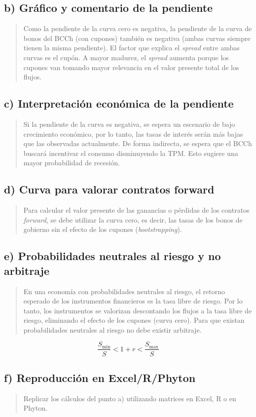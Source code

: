 \documentclass[12pt]{article}
\begin{document}
\newpage

\subsection*{b) Gráfico y comentario de la pendiente}

\begin{quote}
Como la pendiente de la curva cero es negativa, la pendiente de la curva de bonos del BCCh (con cupones) también es negativa (ambas curvas siempre tienen la misma pendiente). El factor que explica el \textit{spread} entre ambas curvas es el cupón. A mayor madurez, el \textit{spread} aumenta porque los cupones van tomando mayor relevancia en el valor presente total de los flujos.
\end{quote}

\subsection*{c) Interpretación económica de la pendiente}

\begin{quote}
Si la pendiente de la curva es negativa, se espera un escenario de bajo crecimiento económico, por lo tanto, las tasas de interés serán más bajas que las observadas actualmente. De forma indirecta, se espera que el BCCh buscará incentivar el consumo disminuyendo la TPM. Esto sugiere una mayor probabilidad de recesión.
\end{quote}

\subsection*{d) Curva para valorar contratos forward}

\begin{quote}
Para calcular el valor presente de las ganancias o pérdidas de los contratos \textit{forward}, se debe utilizar la curva cero, es decir, las tasas de los bonos de gobierno sin el efecto de los cupones (\textit{bootstrapping}).
\end{quote}

\subsection*{e) Probabilidades neutrales al riesgo y no arbitraje}

\begin{quote}
En una economía con probabilidades neutrales al riesgo, el retorno esperado de los instrumentos financieros es la tasa libre de riesgo. Por lo tanto, los instrumentos se valorizan descontando los flujos a la tasa libre de riesgo, eliminando el efecto de los cupones (curva cero). Para que existan probabilidades neutrales al riesgo no debe existir arbitraje.
\end{quote}

\[
\frac{S_{\min}}{S} < 1 + r < \frac{S_{\max}}{S}
\]

\subsection*{f) Reproducción en Excel/R/Phyton}

\begin{quote}
Replicar los cálculos del punto a) utilizando matrices en Excel, R o en Phyton.
\end{quote}
\end{document}
